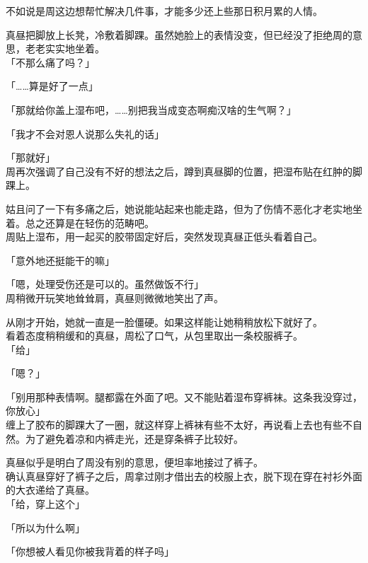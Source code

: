 不如说是周这边想帮忙解决几件事，才能多少还上些那日积月累的人情。

真昼把脚放上长凳，冷敷着脚踝。虽然她脸上的表情没变，但已经没了拒绝周的意思，老老实实地坐着。\\

「不那么痛了吗？」

「……算是好了一点」

「那就给你盖上湿布吧，……别把我当成变态啊痴汉啥的生气啊？」

「我才不会对恩人说那么失礼的话」

「那就好」\\

周再次强调了自己没有不好的想法之后，蹲到真昼脚的位置，把湿布贴在红肿的脚踝上。

姑且问了一下有多痛之后，她说能站起来也能走路，但为了伤情不恶化才老实地坐着。总之还算是在轻伤的范畴吧。\\

周贴上湿布，用一起买的胶带固定好后，突然发现真昼正低头看着自己。

「意外地还挺能干的嘛」

「嗯，处理受伤还是可以的。虽然做饭不行」\\

周稍微开玩笑地耸耸肩，真昼则微微地笑出了声。

从刚才开始，她就一直是一脸僵硬。如果这样能让她稍稍放松下就好了。\\

看着态度稍稍缓和的真昼，周松了口气，从包里取出一条校服裤子。\\

「给」

「嗯？」

「别用那种表情啊。腿都露在外面了吧。又不能贴着湿布穿裤袜。这条我没穿过，你放心」\\

缠上了胶布的脚踝大了一圈，就这样穿上裤袜有些不太好，再说看上去也有些不自然。为了避免着凉和内裤走光，还是穿条裤子比较好。

真昼似乎是明白了周没有别的意思，便坦率地接过了裤子。\\

确认真昼穿好了裤子之后，周拿过刚才借出去的校服上衣，脱下现在穿在衬衫外面的大衣递给了真昼。\\

「给，穿上这个」

「所以为什么啊」

「你想被人看见你被我背着的样子吗」\\

